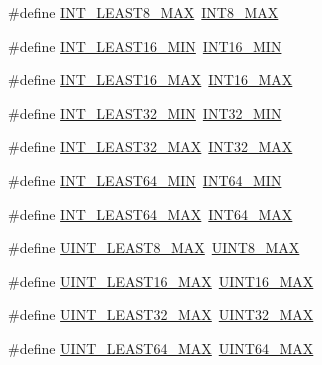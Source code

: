 \begin{DoxyCompactItemize}
\item 
\#define \hyperlink{a00119_aa05109908fb2770f632d2b646b9f85bf}{I\+N\+T\+\_\+\+L\+E\+A\+S\+T8\+\_\+\+M\+AX}~\hyperlink{a00119_aaf7f29f45f1a513b4748a4e5014ddf6a}{I\+N\+T8\+\_\+\+M\+AX}
\item 
\#define \hyperlink{a00119_a1f91bfd5820c2f27af3d260fc75813e1}{I\+N\+T\+\_\+\+L\+E\+A\+S\+T16\+\_\+\+M\+IN}~\hyperlink{a00119_ad4e9955955b27624963643eac448118a}{I\+N\+T16\+\_\+\+M\+IN}
\item 
\#define \hyperlink{a00119_a7eb2a8e2a1c65d6c9ad0f86154890baa}{I\+N\+T\+\_\+\+L\+E\+A\+S\+T16\+\_\+\+M\+AX}~\hyperlink{a00119_ac58f2c111cc9989c86db2a7dc4fd84ca}{I\+N\+T16\+\_\+\+M\+AX}
\item 
\#define \hyperlink{a00119_a2360a536116dd734820a6b5b3d560ce7}{I\+N\+T\+\_\+\+L\+E\+A\+S\+T32\+\_\+\+M\+IN}~\hyperlink{a00119_a688eb21a22db27c2b2bd5836943cdcbe}{I\+N\+T32\+\_\+\+M\+IN}
\item 
\#define \hyperlink{a00119_a5618711a0a54f722190a3a1219e278c2}{I\+N\+T\+\_\+\+L\+E\+A\+S\+T32\+\_\+\+M\+AX}~\hyperlink{a00119_a181807730d4a375f848ba139813ce04f}{I\+N\+T32\+\_\+\+M\+AX}
\item 
\#define \hyperlink{a00119_ac12b4f6966b57ad82feb683b284b4060}{I\+N\+T\+\_\+\+L\+E\+A\+S\+T64\+\_\+\+M\+IN}~\hyperlink{a00119_ab21f12f372f67b8ff0aa3432336ede67}{I\+N\+T64\+\_\+\+M\+IN}
\item 
\#define \hyperlink{a00119_a35d0f98a2e507fd1be779d49da92724e}{I\+N\+T\+\_\+\+L\+E\+A\+S\+T64\+\_\+\+M\+AX}~\hyperlink{a00119_ad0d744f05898e32d01f73f8af3cd2071}{I\+N\+T64\+\_\+\+M\+AX}
\item 
\#define \hyperlink{a00119_a2a80bde77ee1698d0f42f334adad4f2b}{U\+I\+N\+T\+\_\+\+L\+E\+A\+S\+T8\+\_\+\+M\+AX}~\hyperlink{a00119_aeb4e270a084ee26fe73e799861bd0252}{U\+I\+N\+T8\+\_\+\+M\+AX}
\item 
\#define \hyperlink{a00119_a6ef6a1a518bbf516ca8b0180b11c358f}{U\+I\+N\+T\+\_\+\+L\+E\+A\+S\+T16\+\_\+\+M\+AX}~\hyperlink{a00119_a3ea490c9b3617d4479bd80ef93cd5602}{U\+I\+N\+T16\+\_\+\+M\+AX}
\item 
\#define \hyperlink{a00119_a70cad8bacc9a6db301e1cdc86cc8d571}{U\+I\+N\+T\+\_\+\+L\+E\+A\+S\+T32\+\_\+\+M\+AX}~\hyperlink{a00119_ab5eb23180f7cc12b7d6c04a8ec067fdd}{U\+I\+N\+T32\+\_\+\+M\+AX}
\item 
\#define \hyperlink{a00119_aab530113fa96e280e49c3c138b0f917d}{U\+I\+N\+T\+\_\+\+L\+E\+A\+S\+T64\+\_\+\+M\+AX}~\hyperlink{a00119_a30654b4b67d97c42ca3f9b6052dda916}{U\+I\+N\+T64\+\_\+\+M\+AX}
\item 

\end{DoxyCompactItemize}
